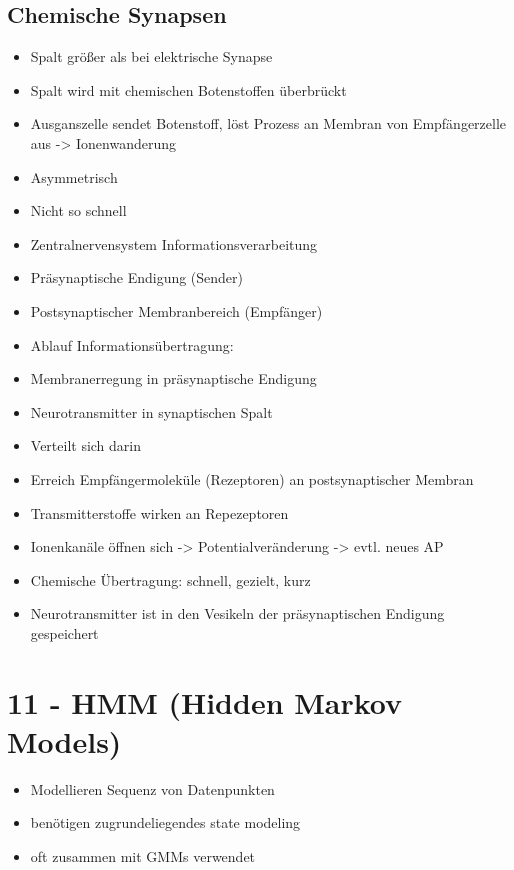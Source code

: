 \documentclass[a4paper,10pt,oneside]{article}
\begin{document}
\subsection{Chemische Synapsen}
\begin{itemize}
	\item Spalt größer als bei elektrische Synapse
	\item Spalt wird mit chemischen Botenstoffen überbrückt
	\item Ausganszelle sendet Botenstoff, löst Prozess an Membran von Empfängerzelle aus -> Ionenwanderung
	\item Asymmetrisch
	\item Nicht so schnell
	\item Zentralnervensystem Informationsverarbeitung
	\item Präsynaptische Endigung (Sender)
	\item Postsynaptischer Membranbereich (Empfänger)
	\item Ablauf Informationsübertragung:
	\item Membranerregung in präsynaptische Endigung
	\item Neurotransmitter in synaptischen Spalt
	\item Verteilt sich darin
	\item Erreich Empfängermoleküle (Rezeptoren) an postsynaptischer Membran
	\item Transmitterstoffe wirken an Repezeptoren
	\item Ionenkanäle öffnen sich -> Potentialveränderung -> evtl. neues AP
	\item Chemische Übertragung: schnell, gezielt, kurz
	\item Neurotransmitter ist in den Vesikeln der präsynaptischen Endigung gespeichert
\end{itemize}







\section{11 - HMM (Hidden Markov Models)}
	\begin{itemize}
		\item Modellieren Sequenz von Datenpunkten
		\item benötigen zugrundeliegendes state modeling
		\item oft zusammen mit GMMs verwendet
	\end{itemize}
	
\end{document}
